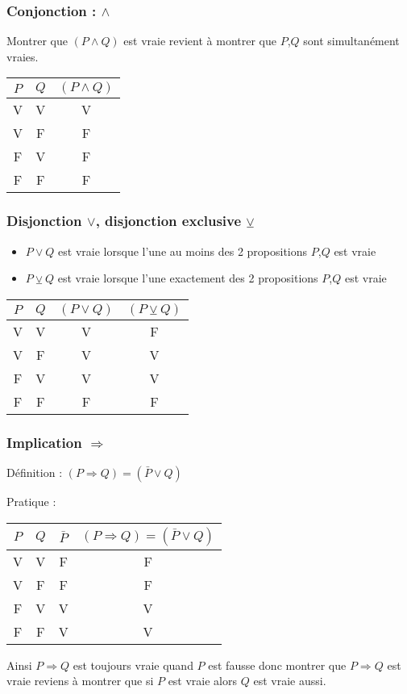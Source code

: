 \documentclass[12pt,a4paper,french]{book}
\begin{document}
\subsubsection{Conjonction : $\wedge$}
Montrer que $\left(P \wedge Q\right)$ est vraie revient à montrer que $P$,$Q$ sont simultanément vraies.
\begin{center}
	\begin{tabular}{ |c||c||c| }
		\hline
		$P$ & $Q$ & $\left(P \wedge Q\right)$\\
		\hline
		V&V&V\\
		V&F&F\\
		F&V&F\\
		F&F&F\\
		\hline
	\end{tabular}
\end{center}

\subsubsection{Disjonction $\vee$, disjonction exclusive $\veebar$ }
\begin{itemize}
	\item $P \vee Q$ est vraie lorsque l'une au moins des 2 propositions $P$,$Q$ est vraie
	\item $P \veebar Q$ est vraie lorsque l'une exactement des 2 propositions $P$,$Q$ est vraie
\end{itemize}
\begin{center}
	\begin{tabular}{ |c||c||c||c| }
		\hline
		$P$ & $Q$ & $\left(P \vee Q\right)$ & $\left(P \veebar Q\right)$\\
		\hline
		V&V&V&F\\
		V&F&V&V\\
		F&V&V&V\\
		F&F&F&F\\
		\hline
	\end{tabular}
\end{center}
\subsubsection{Implication $\Rightarrow$}

Définition : $\left(P \Rightarrow Q\right) = \left(\bar{P} \vee Q \right)$ 

Pratique :
\begin{center}
	\begin{tabular}{ |c||c||c||c| }
		\hline
		$P$ & $Q$ & $\bar{P}$ & $\left(P \Rightarrow Q\right) = \left(\bar{P} \vee Q \right)$\\
		\hline
		V&V&F&F\\
		V&F&F&F\\
		F&V&V&V\\
		F&F&V&V\\
		\hline
	\end{tabular}
\end{center}
Ainsi $P \Rightarrow Q$ est toujours vraie quand $P$ est fausse donc montrer que $P \Rightarrow Q$ est vraie reviens à montrer que si $P$ est vraie alors $Q$ est vraie aussi.
\end{document}
